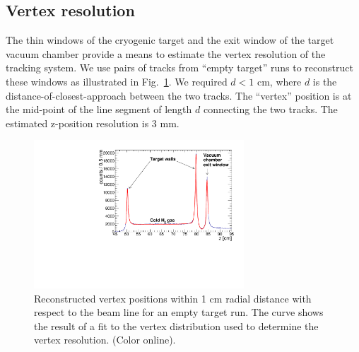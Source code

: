 \subsection{Vertex resolution}

The thin windows of the cryogenic target and the exit window of the target
vacuum chamber provide a means to estimate the 
vertex resolution of the tracking system.  We use pairs of tracks from 
``empty target'' runs to reconstruct these windows as illustrated in 
Fig.~\ref{fig:z-vertex}.  We required $d<1$ cm, where $d$ is the 
distance-of-closest-approach between the two tracks. The ``vertex'' position 
is at the mid-point of the line segment of length $d$ connecting the two tracks.
The estimated z-position resolution is 3 mm.

\begin{figure}[tbp]
\begin{center}
\includegraphics[width=0.7\textwidth]{figures/ZVertex.pdf}  
\caption{\label{fig:z-vertex} Reconstructed vertex positions within 1 cm radial
 distance with respect to the beam line for an empty target run.  The curve shows the result of a fit to the vertex distribution used to determine the vertex
resolution.  (Color online). 
}   
\end{center}  
\end{figure}


